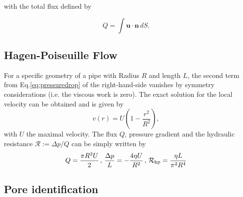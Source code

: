 \documentclass[draft]{agujournal2019}
\begin{document}
with the total flux defined by 

\begin{equation}
	Q=\int \mathbf{u}\cdot\mathbf{n}\, dS.
\end{equation}




\subsection{Hagen-Poiseuille Flow} 

For a specific geometry of a pipe with Radius $R$ and length $L$, the second term from Eq.\ref{eq:pressuredrop} of the right-hand-side vanishes by symmetry considerations (i.e. the viscous work is zero). The exact solution for the local velocity can be obtained and is given by 
\begin{equation}\label{eq:poiseuille}
v(r)=U \left(1-\frac{r^2}{R^2}\right),
\end{equation}
with $U$ the maximal velocity. The flux $Q$, pressure gradient and the hydraulic resistance $\mathcal{R}:=\Delta p/Q$ can be simply written by
\begin{equation}
	Q=\frac{\pi R^2 U}{2}\,,\,\frac{\Delta p}{L}=-\frac{4\eta U}{R^2}\, , \, \mathcal{R}_{\rm{hp}}= \frac{\eta L}{\pi^2 R^4}
\end{equation}


\subsection{Pore identification}
\end{document}
